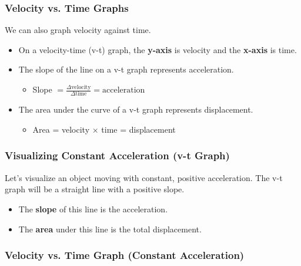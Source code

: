 \documentclass{beamer}
\begin{document}
\begin{frame}
\frametitle{Velocity vs. Time Graphs}
We can also graph velocity against time.
\begin{itemize}
    \item On a velocity-time (v-t) graph, the \textbf{y-axis} is velocity and the \textbf{x-axis} is time.
    \item The \alert{slope} of the line on a v-t graph represents \alert{acceleration}.
    \begin{itemize}
        \item Slope $= \frac{\Delta \text{velocity}}{\Delta \text{time}} = \text{acceleration}$
    \end{itemize}
    \item The \alert{area under the curve} of a v-t graph represents \alert{displacement}.
    \begin{itemize}
        \item Area = velocity $\times$ time = displacement
    \end{itemize}
\end{itemize}
\end{frame}

\begin{frame}
\frametitle{Visualizing Constant Acceleration (v-t Graph)}
Let's visualize an object moving with constant, positive acceleration. The v-t graph will be a straight line with a positive slope.
\begin{itemize}
    \item The \textbf{slope} of this line is the acceleration.
    \item The \textbf{area} under this line is the total displacement.
\end{itemize}
\end{frame}

\begin{frame}
\frametitle{Velocity vs. Time Graph (Constant Acceleration)}
\begin{figure}
\end{figure}
\end{frame}
\end{document}
